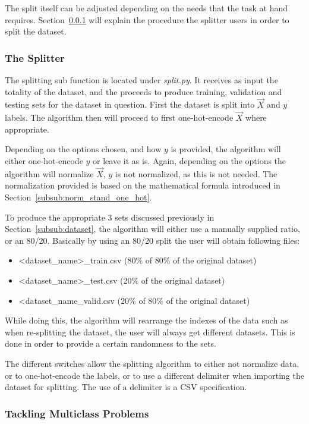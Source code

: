 \documentclass[12pt]{article}
\begin{document}
The split itself can be adjusted depending on the needs that the task at hand requires. Section~\ref{subsub:splitter} will explain the procedure the splitter users in order to split the dataset.

\subsubsection{The Splitter}
\label{subsub:splitter}

The splitting sub function is located under \emph{split.py}. It receives as input the totality of the dataset, and the proceeds to produce training, validation and testing sets for the dataset in question. First the dataset is split into $\vec{X}$ and $y$ labels. The algorithm then will proceed to first one-hot-encode $\vec{X}$ where appropriate.

Depending on the options chosen, and how $y$ is provided, the algorithm will either one-hot-encode $y$ or leave it as is. Again, depending on the options the algorithm will normalize $\vec{X}$, $y$ is not normalized, as this is not needed. The normalization provided is based on the mathematical formula introduced in Section~\ref{subsub:norm_stand_one_hot}.

To produce the appropriate 3 sets discussed previously in Section~\ref{subsub:dataset}, the algorithm will either use a manually supplied ratio, or an 80/20. Basically by using an 80/20 split the user will obtain following files:
\begin{itemize}
    \item <dataset\_name>\_train.csv (80\% of 80\% of the original dataset)
    \item <dataset\_name>\_test.csv (20\% of the original dataset)
    \item <dataset\_name\_valid.csv (20\% of 80\% of the original dataset)
\end{itemize}

While doing this, the algorithm will rearrange the indexes of the data such as when re-splitting the dataset, the user will always get different datasets. This is done in order to provide a certain randomness to the sets.

The different switches allow the splitting algorithm to either not normalize data, or to one-hot-encode the labels, or to use a different delimiter when importing the dataset for splitting. The use of a delimiter is a CSV specification.

\subsubsection{Tackling Multiclass Problems}
\label{subsub:multiclass_problem}
\end{document}
